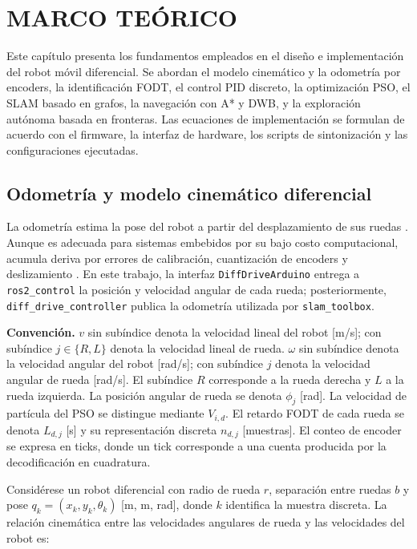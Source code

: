 \chapter{MARCO TEÓRICO}
\label{marco_teorico}

Este capítulo presenta los fundamentos empleados en el diseño e implementación del robot móvil diferencial. Se abordan el modelo cinemático y la odometría por encoders, la identificación FODT, el control PID discreto, la optimización PSO, el SLAM basado en grafos, la navegación con A* y DWB, y la exploración autónoma basada en fronteras. Las ecuaciones de implementación se formulan de acuerdo con el firmware, la interfaz de hardware, los scripts de sintonización y las configuraciones ejecutadas.

\section{Odometría y modelo cinemático diferencial}
\label{sec:odometria}

La odometría estima la pose del robot a partir del desplazamiento de sus ruedas \citep{ferreira2023differential}. Aunque es adecuada para sistemas embebidos por su bajo costo computacional, acumula deriva por errores de calibración, cuantización de encoders y deslizamiento \citep{corke2023}. En este trabajo, la interfaz \texttt{DiffDriveArduino} entrega a \texttt{ros2\_control} la posición y velocidad angular de cada rueda; posteriormente, \texttt{diff\_drive\_controller} publica la odometría utilizada por \texttt{slam\_toolbox}.

\noindent\textbf{Convención.} $v$ sin subíndice denota la velocidad lineal del robot [m/s]; con subíndice $j\in\{R,L\}$ denota la velocidad lineal de rueda. $\omega$ sin subíndice denota la velocidad angular del robot [rad/s]; con subíndice $j$ denota la velocidad angular de rueda [rad/s]. El subíndice $R$ corresponde a la rueda derecha y $L$ a la rueda izquierda. La posición angular de rueda se denota $\phi_j$ [rad]. La velocidad de partícula del PSO se distingue mediante $V_{i,d}$. El retardo FODT de cada rueda se denota $L_{d,j}$ [s] y su representación discreta $n_{d,j}$ [muestras]. El conteo de encoder se expresa en ticks, donde un tick corresponde a una cuenta producida por la decodificación en cuadratura.

Considérese un robot diferencial con radio de rueda $r$, separación entre ruedas $b$ y pose $q_k=(x_k,y_k,\theta_k)$ [m, m, rad], donde $k$ identifica la muestra discreta. La relación cinemática entre las velocidades angulares de rueda y las velocidades del robot es:

